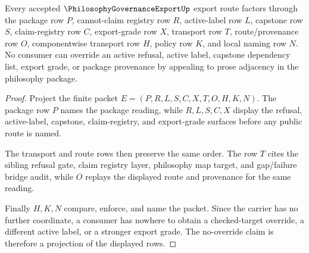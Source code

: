 \begin{theorem}
\label{thm:philosophy-governance-export-no-override}
Every accepted $\PhilosophyGovernanceExportUp$ export route factors through the package row $P$, cannot-claim registry row $R$, active-label row $L$, capstone row $S$, claim-registry row $C$, export-grade row $X$, transport row $T$, route/provenance row $O$, componentwise transport row $H$, policy row $K$, and local naming row $N$. No consumer can override an active refusal, active label, capstone dependency list, export grade, or package provenance by appealing to prose adjacency in the philosophy package.
\end{theorem}
\begin{proof}
Project the finite packet $E=(P,R,L,S,C,X,T,O,H,K,N)$. The package row $P$ names the package reading, while $R,L,S,C,X$ display the refusal, active-label, capstone, claim-registry, and export-grade surfaces before any public route is named.

The transport and route rows then preserve the same order. The row $T$ cites the sibling refusal gate, claim registry layer, philosophy map target, and gap/failure bridge audit, while $O$ replays the displayed route and provenance for the same reading.

Finally $H,K,N$ compare, enforce, and name the packet. Since the carrier has no further coordinate, a consumer has nowhere to obtain a checked-target override, a different active label, or a stronger export grade. The no-override claim is therefore a projection of the displayed rows.
\end{proof}

